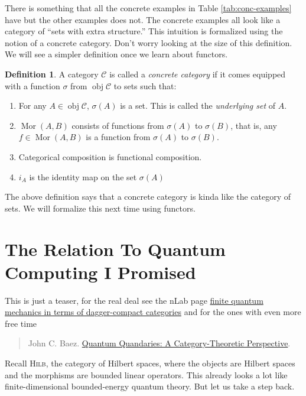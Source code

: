 \documentclass[english,12pt]{article}
\theoremstyle{definition}
\newtheorem{definition}[theorem]{Definition}
\DeclareMathOperator{\obj}{obj}
\DeclareMathOperator{\Mor}{Mor}
\newcommand{\C}{\mathcal{C}}
\begin{document}
There is something that all the concrete examples in Table
\ref{tab:conc-examples} have but the other examples does not. The concrete
examples all look like a category of ``sets with extra structure.'' This
intuition is formalized using the notion of a concrete category. Don't
worry looking at the size of this definition. We will see a simpler
definition once we learn about functors.

\begin{definition}
  A category $\C$ is called a \emph{concrete category} if it comes equipped
  with a function $\sigma$ from $\obj \C$ to sets such that:
  \begin{enumerate}
  \item For any $A \in \obj \C$, $\sigma(A)$ is a set. This is called the
    \emph{underlying set} of $A$.
  \item $\Mor(A,B)$ consists of functions from $\sigma(A)$ to $\sigma(B)$,
    that is, any $f \in \Mor(A,B)$ is a function from $\sigma(A)$ to
    $\sigma(B)$.
  \item Categorical composition is functional composition.
  \item $i_A$ is the identity map on the set $\sigma(A)$
  \end{enumerate}
\end{definition}

The above definition says that a concrete category is kinda like the
category of sets. We will formalize this next time using functors.

\section{The Relation To Quantum Computing I Promised}

This is just a teaser, for the real deal see the nLab page
\href{https://ncatlab.org/nlab/show/finite+quantum+mechanics+in+terms+of+dagger-compact+categories}{finite
  quantum mechanics in terms of dagger-compact categories} and for the ones
with even more free time
\begin{quote}
  John C. Baez. \href{http://math.ucr.edu/home/baez/quantum/}{Quantum Quandaries: A Category-Theoretic Perspective}.
\end{quote}

Recall \textsc{Hilb}, the category of Hilbert spaces, where the objects are
Hilbert spaces and the morphisms are bounded linear operators. This already
looks a lot like finite-dimensional bounded-energy quantum theory. But let
us take a step back.
\end{document}
